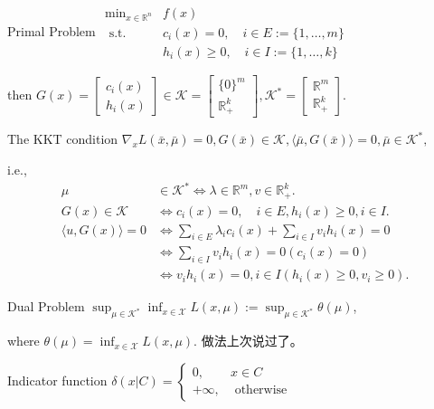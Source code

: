 \begin{eg}
  Primal Problem $\begin{array}{ll}
    \min_{x \in \mathbb{R}^{n}} & f(x) \\
    \text { s.t. } & c_{i}(x)=0, \quad i \in E:=\{1, \ldots, m\} \\
    & h_{i}(x) \geq 0, \quad i \in I:=\{1, \ldots, k\}
  \end{array}$

  then $G(x) = \left[\begin{array}{c}
    c_i(x)\\
    h_i(x)
  \end{array}\right] \in \mathcal{K} = \left[\begin{array}{c}
    \{0\}^m\\
    \mathbb{R}_+^k
  \end{array}\right], \mathcal{K}^{\ast} = \left[\begin{array}{c}
    \mathbb{R}^m\\
    \mathbb{R}_+^k
  \end{array}\right]$.

  The KKT condition $\nabla_{x} L(\bar{x}, \bar{\mu})=0, G(\bar{x}) \in \mathcal{K},\langle\bar{\mu}, G(\bar{x})\rangle=0, \bar{\mu} \in \mathcal{K}^{*},
  $

  i.e.,
  \[
    \begin{aligned}
      \mu & \in \mathcal{K}^{*} \Longleftrightarrow \lambda \in \mathbb{R}^{m}, v \in \mathbb{R}_{+}^{k} . \\
      G(x) \in \mathcal{K} & \Longleftrightarrow c_{i}(x)=0, \quad i \in E, h_{i}(x) \geq 0, i \in I . \\
      \langle u, G(x)\rangle=0 & \Longleftrightarrow \sum_{i \in E} \lambda_{i} c_{i}(x)+\sum_{i \in I} v_{i} h_{i}(x)=0 \\
      & \Longleftrightarrow \sum_{i \in I} v_{i} h_{i}(x)=0\left(c_{i}(x)=0\right) \\
      & \Longleftrightarrow v_{i} h_{i}(x)=0, i \in I\left(h_{i}(x) \geq 0, v_{i} \geq 0\right) .
    \end{aligned}
  \]
\end{eg}

Dual Problem $\sup _{\mu \in \mathcal{K}^{*}} \inf _{x \in \mathcal{X}} L(x, \mu):=\sup _{\mu \in \mathcal{K}^{*}} \theta(\mu)$,

where $\theta(\mu)=\inf _{x \in \mathcal{X}} L(x, \mu)$. 做法上次说过了。

Indicator function $\delta(x | C)=\left\{\begin{array}{ll}
  0, & x \in C \\
  +\infty, & \text { otherwise }
\end{array}\right.$


